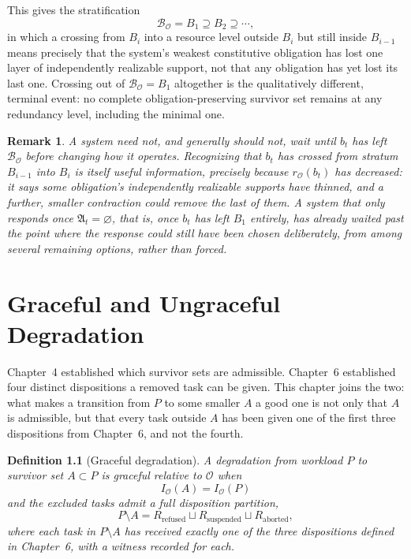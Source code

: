 \documentclass[11pt]{report}
\newtheorem{definition}{Definition}[chapter]
\newtheorem{remark}[definition]{Remark}
\begin{document}
This gives the stratification
\[
\mathcal B_{\mathcal O} = B_1 \supseteq B_2 \supseteq \cdots,
\]
in which a crossing from $B_i$ into a resource level outside $B_i$ but still inside $B_{i-1}$ means precisely that the system's weakest constitutive obligation has lost one layer of independently realizable support, not that any obligation has yet lost its last one. Crossing out of $\mathcal B_{\mathcal O} = B_1$ altogether is the qualitatively different, terminal event: no complete obligation-preserving survivor set remains at any redundancy level, including the minimal one.

\begin{remark}
A system need not, and generally should not, wait until $b_t$ has left $\mathcal B_{\mathcal O}$ before changing how it operates. Recognizing that $b_t$ has crossed from stratum $B_{i-1}$ into $B_i$ is itself useful information, precisely because $r_{\mathcal O}(b_t)$ has decreased: it says some obligation's independently realizable supports have thinned, and a further, smaller contraction could remove the last of them. A system that only responds once $\mathfrak A_t = \varnothing$, that is, once $b_t$ has left $B_1$ entirely, has already waited past the point where the response could still have been chosen deliberately, from among several remaining options, rather than forced.
\end{remark}

\chapter{Graceful and Ungraceful Degradation}

Chapter~4 established which survivor sets are admissible. Chapter~6 established four distinct dispositions a removed task can be given. This chapter joins the two: what makes a transition from $P$ to some smaller $A$ a good one is not only that $A$ is admissible, but that every task outside $A$ has been given one of the first three dispositions from Chapter~6, and not the fourth.

\begin{definition}[Graceful degradation]
A degradation from workload $P$ to survivor set $A \subset P$ is graceful relative to $\mathcal O$ when
\[
I_{\mathcal O}(A) = I_{\mathcal O}(P)
\]
and the excluded tasks admit a full disposition partition,
\[
P \setminus A = R_{\mathrm{refused}} \sqcup R_{\mathrm{suspended}} \sqcup R_{\mathrm{aborted}},
\]
where each task in $P \setminus A$ has received exactly one of the three dispositions defined in Chapter~6, with a witness recorded for each.
\end{definition}
\end{document}
